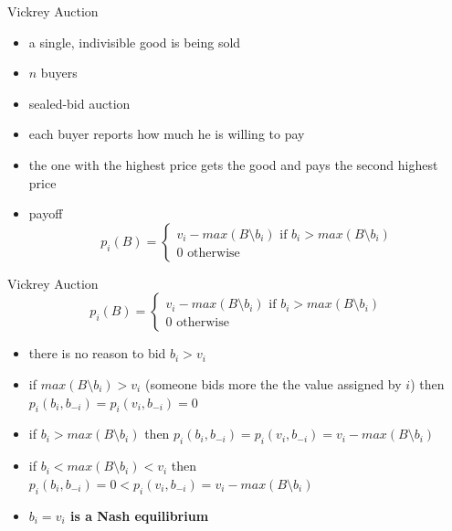 \documentclass{beamer}
\begin{document}
\begin{frame}{Vickrey Auction}
  \begin{itemize}
    \item a single, indivisible good is being sold
    \item $n$ buyers
    \item sealed-bid auction
    \item each buyer reports how much he is willing to pay
    \item<2-> the one with the highest price gets the good and pays
      the second highest price
    \item<3-> payoff
\[
p_i(B) = \left \{
  \begin{array}{l}
    v_i - max(B \setminus b_i) \mbox{ if } b_i > max(B \setminus b_i)\\
    0         \mbox{ otherwise }
  \end{array}
\right .
\]
  \end{itemize}
\end{frame}


\begin{frame}{Vickrey Auction}
\[
p_i(B) = \left \{
  \begin{array}{l}
    v_i - max(B \setminus b_i) \mbox{ if } b_i > max(B \setminus b_i)\\
    0         \mbox{ otherwise }
  \end{array}
\right .
\]
  \begin{itemize}
    \item there is no reason to bid $b_i > v_i$
    \item<2-> if $max(B \setminus b_i) > v_i$ (someone bids more the the value assigned by $i$) then 
      $p_i(b_i, b_{-i}) = p_i(v_i, b_{-i}) = 0$
    \item<3-> if $b_i > max(B \setminus b_i)$  then 
      $p_i(b_i, b_{-i}) =  p_i(v_i, b_{-i}) = v_i - max(B \setminus b_i)$
    \item<4-> if $b_i < max(B \setminus b_i) < v_i$  then 
      $p_i(b_i, b_{-i}) =  0 < p_i(v_i, b_{-i}) = v_i - max(B
      \setminus b_i)$
    \item<5> \textbf{$b_i = v_i$ is a Nash equilibrium}
  \end{itemize}
\end{frame}
\end{document}
